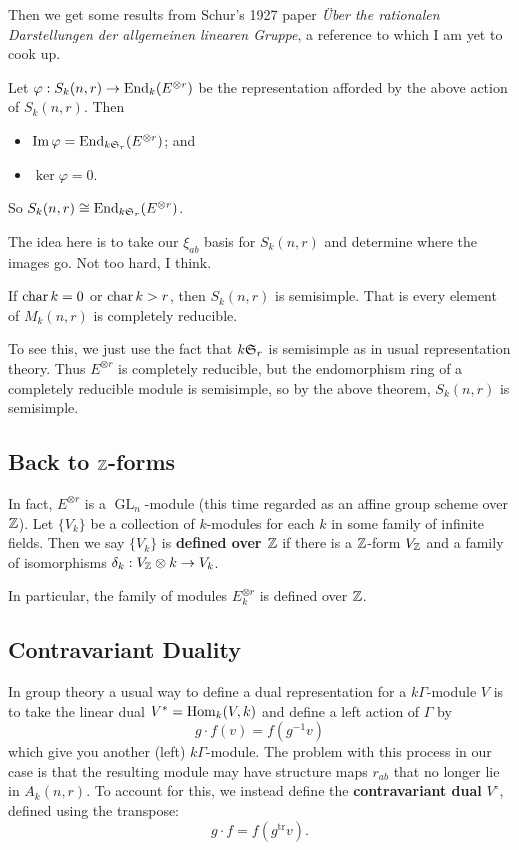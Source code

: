 \documentclass[12pt]{article}
\DeclareMathOperator{\1}{\mathbbm{1}}
\DeclareMathOperator{\GL}{GL}
\begin{document}
Then we get some results from Schur's 1927 paper \textit{\"Uber the rationalen Darstellungen der allgemeinen linearen Gruppe}, a reference to which I am yet to cook up.
\begin{thm}[Schur]
	Let $\varphi:S_k(n,r)\to \operatorname{End}_k(E^{\otimes r})$ be the representation afforded by the above action of $S_k(n,r)$. Then 
	\begin{itemize}
		\item $\operatorname{Im} \varphi=\operatorname{End}_{k\mathfrak{S}_r}(E^{\otimes r})$; and 
		\item $\ker\varphi=0$.
	\end{itemize}
	So $S_k(n,r)\cong \operatorname{End}_{k\mathfrak{S}_r}(E^{\otimes r})$.
\end{thm}
The idea here is to take our $\xi_{ab}$ basis for $S_k(n,r)$ and determine where the images go. Not too hard, I think.
\begin{cor}[Schur]
	If $\operatorname{char} k=0$ or $\operatorname{char} k>r$, then $S_k(n,r)$ is semisimple. That is every element of $M_k(n,r)$ is completely reducible.
\end{cor}
To see this, we just use the fact that $k\mathfrak{S}_r$ is semisimple as in usual representation theory. Thus $E^{\otimes r}$ is 
completely reducible, but the endomorphism ring of a completely reducible module is semisimple, so by the above theorem, $S_k(n,r)$ is semisimple.

\subsection{Back to \texorpdfstring{$\mathbb{Z}$}{Z}-forms}
In fact, $E^{\otimes r}$ is a $\GL_n$-module (this time regarded as an affine group scheme over $\mathbb{Z}$). Let $\{V_k\}$ be a collection 
of $k$-modules for each $k$ in some family of infinite fields. Then we say $\{V_k\}$ is \textbf{defined over $\mathbb{Z}$} if there is a $\mathbb{Z}$-form $V_{\mathbb{Z}}$
and a family of isomorphisms $\delta_k:V_{\mathbb{Z}}\otimes k\to V_k$.

In particular, the family of modules $E^{\otimes r}_k$ is defined over $\mathbb{Z}$.

\subsection{Contravariant Duality}
In group theory a usual way to define a dual representation for a $k\Gamma$-module $V$ is to take the linear 
dual $V^\ast=\operatorname{Hom}_k(V,k)$ and define a left action of $\Gamma$ by 
\[g\cdot f(v)=f(g^{-1}v)\]
which give you another (left) $k\Gamma$-module. The problem with this process in our case is that the resulting 
module may have structure maps $r_{ab}$ that no longer lie in $A_k(n,r)$. To account for this, we instead define the 
\textbf{contravariant dual} $V^\circ$, defined using the transpose:
\[g\cdot f=f(g^{\text{tr}}v).\]
\end{document}
